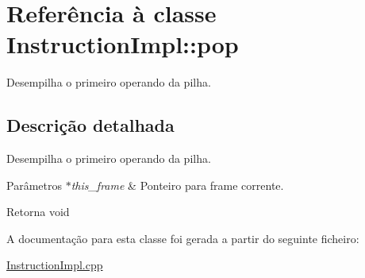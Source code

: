 \hypertarget{class_instruction_impl_1_1pop}{}\section{Referência à classe Instruction\+Impl\+:\+:pop}
\label{class_instruction_impl_1_1pop}


Desempilha o primeiro operando da pilha.  




\subsection{Descrição detalhada}
Desempilha o primeiro operando da pilha. 


\begin{DoxyParams}{Parâmetros}
{\em $\ast$this\+\_\+frame} & Ponteiro para frame corrente. \\
\hline
\end{DoxyParams}
\begin{DoxyReturn}{Retorna}
void 
\end{DoxyReturn}


A documentação para esta classe foi gerada a partir do seguinte ficheiro\+:\begin{DoxyCompactItemize}
\item 
\hyperlink{_instruction_impl_8cpp}{Instruction\+Impl.\+cpp}\end{DoxyCompactItemize}
